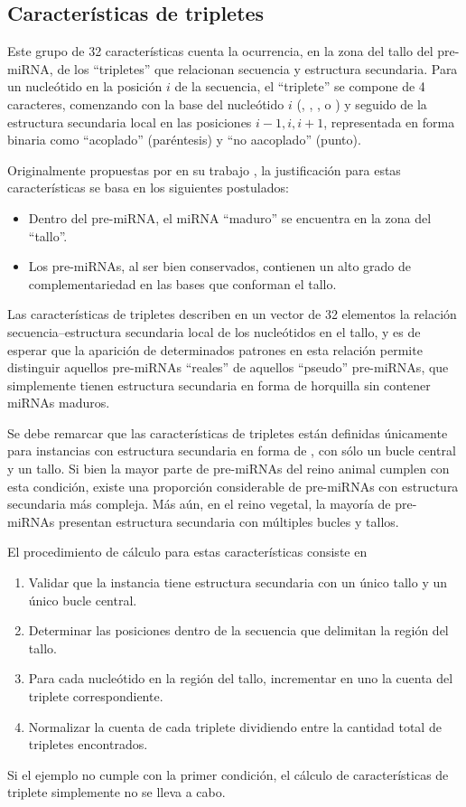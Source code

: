 %
%
\subsection{Características de tripletes}
%
Este grupo de 32 características cuenta la ocurrencia, en la zona del
tallo del pre-miRNA, de los ``tripletes'' que relacionan secuencia y
estructura secundaria. Para un nucleótido en la posición $i$ de la
secuencia, el ``triplete'' se compone de 4 caracteres, comenzando con
la base del nucleótido $i$ (\ntA, \ntC, \ntG, o \ntU) y seguido de la
estructura secundaria local en las posiciones $i-1,i,i+1$,
representada en forma binaria como ``acoplado'' \pairL (paréntesis) y
``no aacoplado'' \noPair (punto).

Originalmente propuestas por \citeauthor{xue} en su trabajo
\cite{xue}, la justificación para estas características se basa en los
siguientes postulados:
%
\begin{itemize}
\item Dentro del pre-miRNA, el miRNA ``maduro'' se encuentra en la
  zona del ``tallo''.
\item Los pre-miRNAs, al ser bien conservados, contienen un alto grado
  de complementariedad en las bases que conforman el tallo.
\end{itemize}
%
Las características de tripletes describen en un vector de 32
elementos la relación secuencia--estructura secundaria local de los
nucleótidos en el tallo, y es de esperar que la aparición de
determinados patrones en esta relación permite distinguir aquellos
pre-miRNAs ``reales'' de aquellos ``pseudo'' pre-miRNAs, que
simplemente tienen estructura secundaria en forma de horquilla sin
contener miRNAs maduros.

Se debe remarcar que las características de tripletes están definidas
únicamente para instancias con estructura secundaria en forma de
, con sólo un bucle central y un tallo.  Si bien la mayor
parte de pre-miRNAs del reino animal cumplen con esta condición,
existe una proporción considerable de pre-miRNAs con estructura
secundaria más compleja. Más aún, en el reino vegetal, la mayoría de
pre-miRNAs presentan estructura secundaria con múltiples bucles y
tallos.

El procedimiento de cálculo para estas características consiste en
%
\begin{enumerate}
\item Validar que la instancia tiene estructura secundaria con un
  único tallo y un único bucle central.
\item Determinar las posiciones dentro de la secuencia que delimitan
  la región del tallo.
\item Para cada nucleótido en la región del tallo, incrementar en uno
  la cuenta del triplete correspondiente.
\item Normalizar la cuenta de cada triplete dividiendo entre la
  cantidad total de tripletes encontrados.
\end{enumerate}
%
Si el ejemplo no cumple con la primer condición, el cálculo de
características de triplete simplemente no se lleva a cabo.
